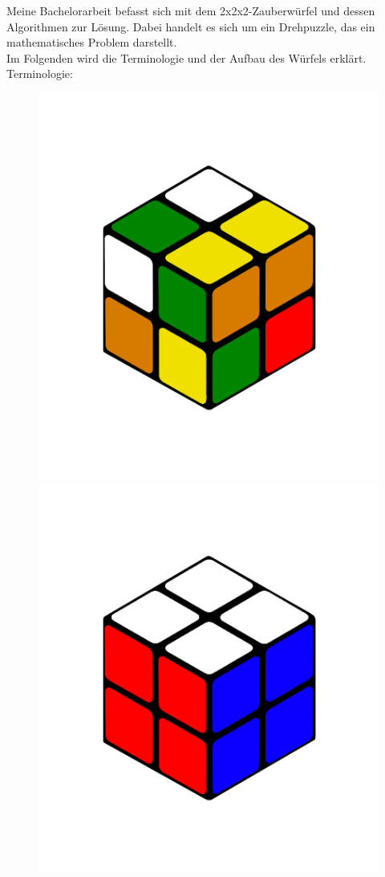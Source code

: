 \documentclass[12pt,a4paper, usenames, dvipsnames]{article}
\begin{document}
Meine Bachelorarbeit befasst sich mit dem 2x2x2-Zauberwürfel und dessen Algorithmen zur Lösung. Dabei handelt es sich um ein Drehpuzzle, das ein mathematisches Problem darstellt. \\ 
Im Folgenden wird die Terminologie und der Aufbau des Würfels erklärt.\\
Terminologie:
\begin{figure}[h]
\centering
\includegraphics[scale=0.1]{2x2scrambled.png}
\includegraphics[scale=0.1]{2x2solved.png}

\end{figure}
\end{document}
